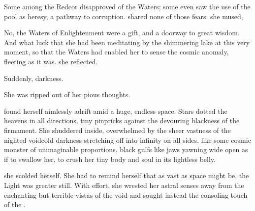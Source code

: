 Some among the Redcor disapproved of the Waters; some even saw the use of the pool as heresy, a pathway to corruption. 
\Esmerel{} shared none of those fears. 
 she mused, 

No, the Waters of Enlightenment were a gift, and a doorway to great wisdom. And what luck that she had been meditating by the shimmering lake at this very moment, so that the Waters had enabled her to sense the cosmic anomaly, fleeting as it was.  she reflected. 


Suddenly, darkness. 

She was ripped out of her pious thoughts. 


\Esmerel{} found herself aimlessly adrift amid a huge, endless space. Stars dotted the heavens in all directions, tiny pinpricks against the devouring blackness of the firmament. 
She 
shuddered inside, overwhelmed by the sheer vastness of the nighted void\dash cold darkness stretching off into infinity on all sides, 
like some cosmic monster of unimaginable proportions, black gulfs like jaws yawning wide open as if to swallow her, to crush her tiny body and soul in its lightless belly. 

 she scolded herself.  She had to remind herself that as vast as space might be, the Light was greater still. 
With effort, she wrested her astral senses away from the enchanting but terrible vistas of the void and sought instead the consoling touch of the \sephiroth. 

